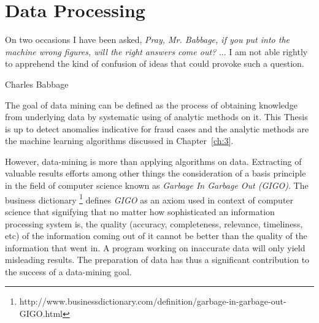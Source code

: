 \chapter{Data Processing}\label{ch:2}
\epigraph{On two occasions I have been asked, \textit{Pray, Mr. Babbage, if you put into the machine wrong figures, will the right answers come out?} ... I am not able rightly to apprehend the kind of confusion of ideas that could provoke such a question.}{Charles Babbage}

The goal of data mining can be defined as the process of obtaining knowledge from underlying data by systematic using of analytic methods on it. This Thesis is up to detect anomalies indicative for fraud cases and the analytic methods are the machine learning algorithms discussed in Chapter~\ref{ch:3}. 

However, data-mining is more than applying algorithms on data. Extracting of valuable results efforts among other things the consideration of a basis principle in the field of computer science known as \textit{Garbage In Garbage Out (GIGO)}. The business dictionary \footnote{http://www.businessdictionary.com/definition/garbage-in-garbage-out-GIGO.html}  defines \textit{GIGO} as an axiom used in context of computer science that signifying that no matter how sophisticated an information processing system is, the quality (accuracy, completeness, relevance, timeliness, etc) of the information coming out of it cannot be better than the quality of the information that went in. A program working on inaccurate data will only yield misleading results. The preparation of data has thus a significant contribution to the success of a data-mining goal.

